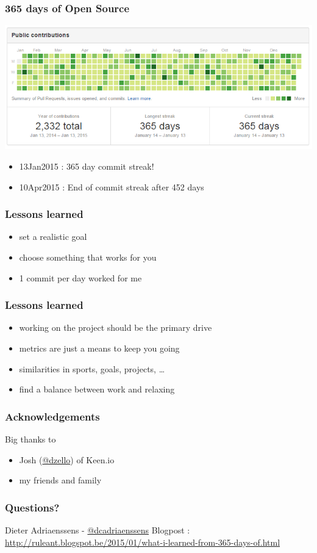 \documentclass[14pt]{beamer}
\begin{document}
  \begin{frame}
    \frametitle{365 days of Open Source}
    \includegraphics[scale=.45]{github_oss365_13jan2015.png}
    \begin{itemize}
      \item 13Jan2015 : 365 day commit streak!
      \item 10Apr2015 : End of commit streak after 452 days
    \end{itemize}
  \end{frame}
  \begin{frame}
    \frametitle{Lessons learned}
    \begin{itemize}
      \item set a realistic goal
      \item choose something that works for you
      \item 1 commit per day worked for me
    \end{itemize}
  \end{frame}
  \begin{frame}
    \frametitle{Lessons learned}
    \begin{itemize}
      \item working on the project should be the primary drive
      \item metrics are just a means to keep you going
      \item similarities in sports, goals, projects, \ldots
      \item find a balance between work and relaxing
    \end{itemize}
  \end{frame}
  \begin{frame}
    \frametitle{Acknowledgements}
    Big thanks to
    \begin{itemize}
      \item Josh (\href{https://twitter.com/dzello}{@dzello}) of Keen.io
      \item my friends and family
    \end{itemize}
  \end{frame}
  \begin{frame}
   \frametitle{Questions?}
    Dieter Adriaenssens - \href{https://twitter.com/dcadriaenssens}{\small{@dcadriaenssens}}
    \vfill
    Blogpost : \href{http://ruleant.blogspot.be/2015/01/what-i-learned-from-365-days-of.html}{http://ruleant.blogspot.be/2015/01/what-i-learned-from-365-days-of.html}
  \end{frame}
\end{document}
